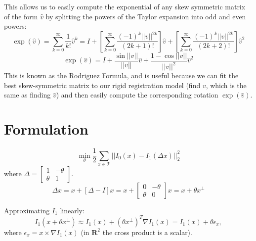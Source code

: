 \documentclass[11pt]{article}
\begin{document}
This allows us to easily compute the exponential of any skew symmetric matrix of the form $\hat{v}$ by splitting the powers of the Taylor expansion into odd and even powers:
\begin{equation}
    \exp(\hat{v})=\sum_{k=0}^{\infty}\frac{1}{k!}\hat{v}^{k} = I + \left[\sum_{k=0}^{\infty}\frac{(-1)^{k}||v||^{2k}}{(2k+1)!}\right]\hat{v}+
    \left[\sum_{k=0}^{\infty}\frac{(-1)^{k}||v||^{2k}}{(2k+2)!}\right]\hat{v}^{2}
\end{equation}
\begin{equation}
    \exp(\hat{v})=I + \frac{\sin{||v||}}{||v||}\hat{v} + \frac{1-\cos{||v||}}{||v||^{2}}\hat{v}^2
\end{equation}
This is known as the Rodriguez Formula, and is useful because we can fit the best skew-symmetric matrix to our rigid registration model (find $v$, which is the same as finding $\hat{v}$) and then easily compute the corresponding rotation $\exp(\hat{v})$.

\section{Formulation}

\begin{equation}
	\min_{\theta} \frac{1}{2}\sum_{x\in\mathcal{T}} ||I_0(x) - I_1(\Delta x)||_{2}^{2}
\end{equation}
where $\Delta = \left[\begin{array}{cc}1 & -\theta \\ \theta & 1\end{array}\right]$.\\

\begin{equation}
	\Delta x = x + \left[ \Delta - I\right]x = x + \left[\begin{array}{cc}0 & -\theta \\ \theta & 0\end{array}\right]x = x + \theta x^{\perp}
\end{equation}

Approximating $I_1$ linearly:
\begin{equation}
	I_{1}(x + \theta x^{\perp}) \approx I_{1}(x) + (\theta x^{\perp})^{T} \nabla I_{1}(x) = I_{1}(x) + \theta \epsilon_{x},
\end{equation}
where $\epsilon_{x} = x \times \nabla I_{1}(x)$ (in $\mathbf{R}^2$ the cross product is a scalar).\\
\end{document}
